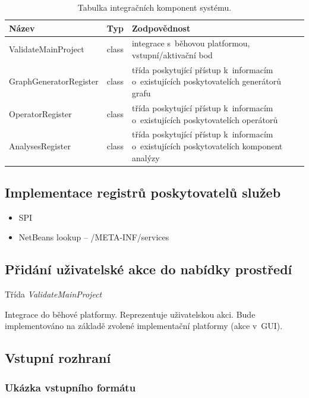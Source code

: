 \begin{table}
  \caption{Tabulka integračních komponent systému. \label{implementation-integration_components}}
  \begin{center}
    \begin{tabular}{ | l | l | p{8cm} | }
      \hline
      \textbf{Název} & \textbf{Typ} & \textbf{Zodpovědnost} \\
      \hline
      \hline
      ValidateMainProject & class & integrace s~běhovou platformou, vstupní/aktivační bod \\ \hline
      GraphGeneratorRegister & class & třída poskytující přístup k~informacím o~existujících poskytovatelích generátorů grafu \\ \hline
      OperatorRegister & class & třída poskytující přístup k~informacím o~existujících poskytovatelích operátorů \\ \hline
      AnalysesRegister & class & třída poskytující přístup k~informacím o~existujících poskytovatelích komponent analýzy \\ \hline
    \end{tabular}
  \end{center}
\end{table}

\subsection{Implementace registrů poskytovatelů služeb}
\begin{itemize}
\item SPI
\item NetBeans lookup -- /META-INF/services
\end{itemize}

\subsection{Přidání uživatelské akce do nabídky prostředí}
Třída \emph{ValidateMainProject}

Integrace do běhové platformy. Reprezentuje uživatelskou akci. Bude implementováno na základě zvolené implementační platformy (akce v~GUI).

\subsection{Vstupní rozhraní}
\subsubsection{Ukázka vstupního formátu}


